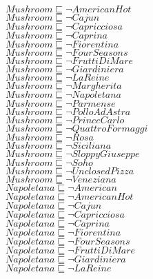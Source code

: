 \documentclass[a4paper,10pt]{article}
\begin{document}
 $Mushroom \sqsubseteq  \lnot AmericanHot$\\ 
 $Mushroom \sqsubseteq  \lnot Cajun$\\ 
 $Mushroom \sqsubseteq  \lnot Capricciosa$\\ 
 $Mushroom \sqsubseteq  \lnot Caprina$\\ 
 $Mushroom \sqsubseteq  \lnot Fiorentina$\\ 
 $Mushroom \sqsubseteq  \lnot FourSeasons$\\ 
 $Mushroom \sqsubseteq  \lnot FruttiDiMare$\\ 
 $Mushroom \sqsubseteq  \lnot Giardiniera$\\ 
 $Mushroom \sqsubseteq  \lnot LaReine$\\ 
 $Mushroom \sqsubseteq  \lnot Margherita$\\ 
 $Mushroom \sqsubseteq  \lnot Napoletana$\\ 
 $Mushroom \sqsubseteq  \lnot Parmense$\\ 
 $Mushroom \sqsubseteq  \lnot PolloAdAstra$\\ 
 $Mushroom \sqsubseteq  \lnot PrinceCarlo$\\ 
 $Mushroom \sqsubseteq  \lnot QuattroFormaggi$\\ 
 $Mushroom \sqsubseteq  \lnot Rosa$\\ 
 $Mushroom \sqsubseteq  \lnot Siciliana$\\ 
 $Mushroom \sqsubseteq  \lnot SloppyGiuseppe$\\ 
 $Mushroom \sqsubseteq  \lnot Soho$\\ 
 $Mushroom \sqsubseteq  \lnot UnclosedPizza$\\ 
 $Mushroom \sqsubseteq  \lnot Veneziana$\\ 
 $Napoletana \sqsubseteq  \lnot American$\\ 
 $Napoletana \sqsubseteq  \lnot AmericanHot$\\ 
 $Napoletana \sqsubseteq  \lnot Cajun$\\ 
 $Napoletana \sqsubseteq  \lnot Capricciosa$\\ 
 $Napoletana \sqsubseteq  \lnot Caprina$\\ 
 $Napoletana \sqsubseteq  \lnot Fiorentina$\\ 
 $Napoletana \sqsubseteq  \lnot FourSeasons$\\ 
 $Napoletana \sqsubseteq  \lnot FruttiDiMare$\\ 
 $Napoletana \sqsubseteq  \lnot Giardiniera$\\ 
 $Napoletana \sqsubseteq  \lnot LaReine$\\ 
\end{document}
